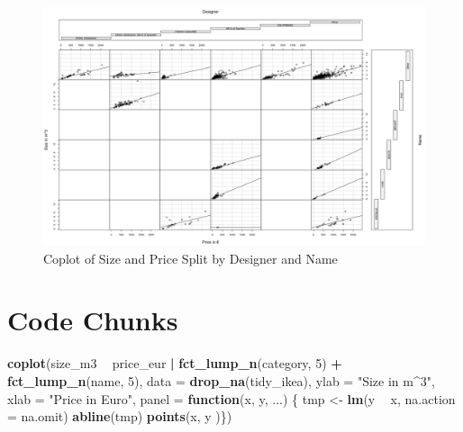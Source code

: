 \documentclass[a4paper, nobind]{templates/ociamthesis}
\newenvironment{Shaded}{\begin{snugshade}}{\end{snugshade}}
\newcommand{\ControlFlowTok}[1]{\textcolor[rgb]{0.13,0.29,0.53}{\textbf{#1}}}
\newcommand{\DataTypeTok}[1]{\textcolor[rgb]{0.13,0.29,0.53}{#1}}
\newcommand{\DecValTok}[1]{\textcolor[rgb]{0.00,0.00,0.81}{#1}}
\newcommand{\KeywordTok}[1]{\textcolor[rgb]{0.13,0.29,0.53}{\textbf{#1}}}
\newcommand{\NormalTok}[1]{#1}
\newcommand{\OperatorTok}[1]{\textcolor[rgb]{0.81,0.36,0.00}{\textbf{#1}}}
\newcommand{\StringTok}[1]{\textcolor[rgb]{0.31,0.60,0.02}{#1}}
\renewenvironment{Shaded}
{
  \vspace{4pt}%
  \begin{snugshade}%
}{%
  \end{snugshade}%
  \vspace{4pt}%
}
\begin{document}
\begin{figure}[!h]
\includegraphics[width=1.5\linewidth,angle=90]{coplot} \caption{Coplot of Size and Price Split by Designer and Name}\label{fig:coplot-code-designer-name}
\end{figure}

\hypertarget{code-chunks}{%
\chapter{Code Chunks}\label{code-chunks}}

\begin{Shaded}
\begin{Highlighting}[]
\KeywordTok{coplot}\NormalTok{(size_m3 }\OperatorTok{~}\StringTok{ }\NormalTok{price_eur }\OperatorTok{|}\StringTok{ }\KeywordTok{fct_lump_n}\NormalTok{(category, }\DecValTok{5}\NormalTok{) }\OperatorTok{+}\StringTok{ }
\StringTok{         }\KeywordTok{fct_lump_n}\NormalTok{(name, }\DecValTok{5}\NormalTok{), }\DataTypeTok{data =} \KeywordTok{drop_na}\NormalTok{(tidy_ikea), }
       \DataTypeTok{ylab =} \StringTok{"Size in m^3"}\NormalTok{,}
       \DataTypeTok{xlab =} \StringTok{"Price in Euro"}\NormalTok{, }\DataTypeTok{panel =} \ControlFlowTok{function}\NormalTok{(x, y, ...) \{}
\NormalTok{         tmp <-}\StringTok{ }\KeywordTok{lm}\NormalTok{(y }\OperatorTok{~}\StringTok{ }\NormalTok{x, }\DataTypeTok{na.action =}\NormalTok{ na.omit)}
         \KeywordTok{abline}\NormalTok{(tmp)}
         \KeywordTok{points}\NormalTok{(x, y )\})}
\end{Highlighting}
\end{Shaded}
\end{document}

